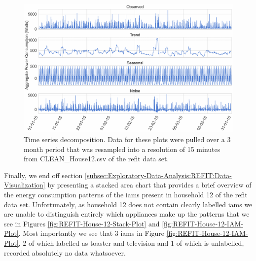 \begin{figure}[H]
    \centering
    \includegraphics[width=\textwidth]{Images/Chapter 5/REFIT/REFIT-House-12-Time-Series-Decomposition-NoSmoothing.pdf}
    \caption{Time series decomposition. Data for these plots were pulled over a 3 month period that was resampled into a resolution of 15 minutes from CLEAN\_House12.csv of the \gls{refit} data set.}
    \label{fig:REFIT-House-12-Time-Series-Decomposition}
\end{figure}

\noindent \newline Finally, we end off section \ref{subsec:Exploratory-Data-Analysis:REFIT:Data-Visualization} by presenting a stacked area chart that provides a brief overview of the energy consumption patterns of the \glspl{iam} present in household 12 of the \gls{refit} data set. Unfortunately, as household 12 does not contain clearly labelled \glspl{iam} we are unable to distinguish entirely which appliances make up the patterns that we see in Figures \ref{fig:REFIT-House-12-Stack-Plot} and \ref{fig:REFIT-House-12-IAM-Plot}. Most importantly we see that 3 \glspl{iam} in Figure \ref{fig:REFIT-House-12-IAM-Plot}, 2 of which labelled as toaster and television and 1 of which is unlabelled, recorded absolutely no data whatsoever.


